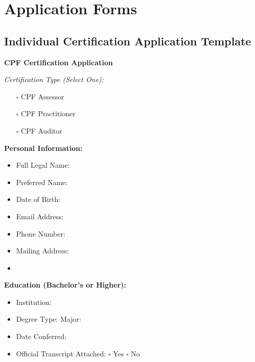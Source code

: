 \documentclass[11pt,a4paper]{article}
\begin{document}
\section{Application Forms}

\subsection{Individual Certification Application Template}

\textbf{CPF Certification Application}

\textit{Certification Type (Select One):}
\begin{itemize}
\item[$\square$] CPF Assessor
\item[$\square$] CPF Practitioner
\item[$\square$] CPF Auditor
\end{itemize}

\textbf{Personal Information:}
\begin{itemize}
\item Full Legal Name: \underline{\hspace{10cm}}
\item Preferred Name: \underline{\hspace{10cm}}
\item Date of Birth: \underline{\hspace{4cm}}
\item Email Address: \underline{\hspace{10cm}}
\item Phone Number: \underline{\hspace{6cm}}
\item Mailing Address: \underline{\hspace{10cm}}
\item \underline{\hspace{12cm}}
\end{itemize}

\textbf{Education (Bachelor's or Higher):}
\begin{itemize}
\item Institution: \underline{\hspace{10cm}}
\item Degree Type: \underline{\hspace{6cm}} Major: \underline{\hspace{5cm}}
\item Date Conferred: \underline{\hspace{4cm}}
\item Official Transcript Attached: $\square$ Yes $\square$ No
\end{itemize}
\end{document}
